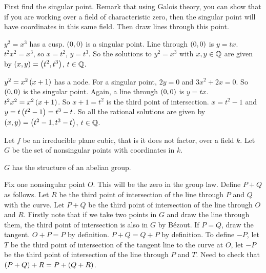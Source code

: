 \begin{algorithm}
First find the singular point. Remark that using Galois theory, you can show that if you are working over a field of characteristic zero, then the singular point will have coordinates in this same field. Then draw lines through this point.
\end{algorithm}


\begin{example*}
$ y^2 = x^3 $ has a cusp. $ \left( 0, 0 \right) $ is a singular point. Line through $ \left( 0, 0 \right) $ is $ y = tx $. $ t^2x^2 = x^3 $, so $ x = t^2 $, $ y = t^3 $. So the solutions to $ y^2 = x^3 $ with $ x, y \in \mathbb{Q} $ are given by $ \left( x, y \right) = \left( t^2, t^3 \right) $, $ t \in \mathbb{Q} $.
\end{example*}

\begin{example*}
$ y^2 = x^2\left( x + 1 \right) $ has a node. For a singular point, $ 2y = 0 $ and $ 3x^2 + 2x = 0 $. So $ \left( 0, 0 \right) $ is the singular point. Again, a line through $ \left( 0, 0 \right) $ is $ y = tx $. $ t^2x^2 = x^2\left( x + 1 \right) $. So $ x + 1 = t^2 $ is the third point of intersection. $ x = t^2 - 1 $ and $ y = t\left( t^2 - 1 \right) = t^3 - t $. So all the rational solutions are given by $ \left( x, y \right) = \left( t^2 - 1, t^3 - t \right) $, $ t \in \mathbb{Q} $.
\end{example*}

\pagebreak

Let $ f $ be an irreducible plane cubic, that is it does not factor, over a field $ k $. Let $ G $ be the set of nonsingular points with coordinates in $ k $.

\begin{theorem}
$ G $ has the structure of an abelian group.
\end{theorem}

Fix one nonsingular point $ O $. This will be the zero in the group law. Define $ P + Q $ as follows. Let $ R $ be the third point of intersection of the line through $ P $ and $ Q $ with the curve. Let $ P + Q $ be the third point of intersection of the line through $ O $ and $ R $. Firstly note that if we take two points in $ G $ and draw the line through them, the third point of intersection is also in $ G $ by Bézout. If $ P = Q $, draw the tangent. $ O + P = P $ by definition. $ P + Q = Q + P $ by definition. To define $ -P $, let $ T $ be the third point of intersection of the tangent line to the curve at $ O $, let $ -P $ be the third point of intersection of the line through $ P $ and $ T $. Need to check that $ \left( P + Q \right) + R = P + \left( Q + R \right) $.

